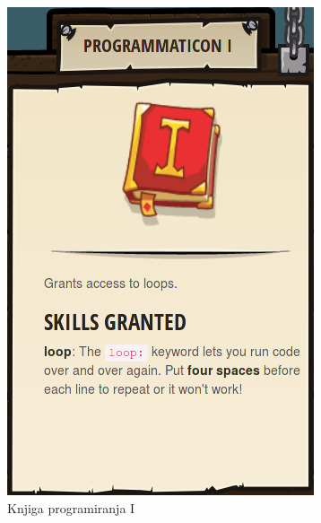 \begin{figure}[h!]
\begin{subfigure}[]{0.25\textwidth}
      \includegraphics[width=\textwidth]{./images/sc_web/cc_EQ-P1-v01.jpg}
        \caption{Knjiga programiranja I}
        \label{fig:cc:eq:p1}
      \end{subfigure}
      \qquad
    \begin{subfigure}[]{0.25\textwidth}

\end{subfigure}
\end{figure}
